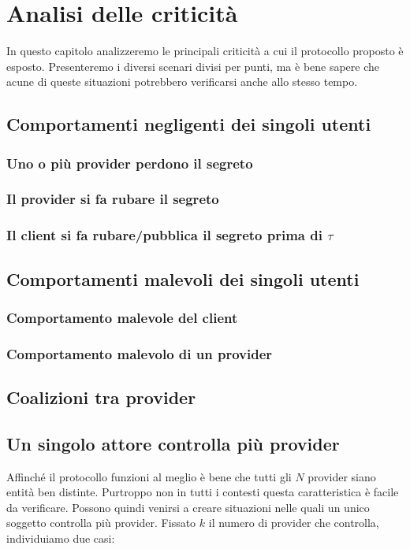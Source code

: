 \chapter{Analisi delle criticità}
\label{chap:analisi-attacchi}
In questo capitolo analizzeremo le principali criticità a cui il protocollo
proposto è esposto. Presenteremo i diversi scenari divisi per punti, ma è bene
sapere che acune di queste situazioni potrebbero verificarsi anche allo stesso
tempo.

\section{Comportamenti negligenti dei singoli utenti}
\subsection{Uno o più provider perdono il segreto}


\subsection{Il provider si fa rubare il segreto}

\subsection{Il client si fa rubare/pubblica il segreto prima di $ \tau $}


\section{Comportamenti malevoli dei singoli utenti}
\subsection{Comportamento malevole del client}

\subsection{Comportamento malevolo di un provider}


\section{Coalizioni tra provider}


\section{Un singolo attore controlla più provider}
Affinché il protocollo funzioni al meglio
è bene che tutti gli $ N $ provider
siano entità ben distinte. Purtroppo non in tutti i contesti
questa caratteristica è facile da verificare.
Possono quindi venirsi a creare situazioni nelle quali un unico soggetto controlla
più provider. Fissato $ k $ il numero di provider che controlla,
individuiamo due casi:
